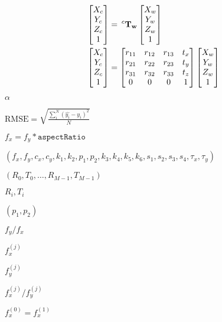 \documentclass{article}
\begin{document}
\[ \begin{align*} \begin{bmatrix} X_c \\ Y_c \\ Z_c \\ 1 \end{bmatrix} &= \hspace{0.2em} ^{c}\bf{T}_w \begin{bmatrix} X_{w} \\ Y_{w} \\ Z_{w} \\ 1 \end{bmatrix} \\ \begin{bmatrix} X_c \\ Y_c \\ Z_c \\ 1 \end{bmatrix} &= \begin{bmatrix} r_{11} & r_{12} & r_{13} & t_x \\ r_{21} & r_{22} & r_{23} & t_y \\ r_{31} & r_{32} & r_{33} & t_z \\ 0 & 0 & 0 & 1 \end{bmatrix} \begin{bmatrix} X_{w} \\ Y_{w} \\ Z_{w} \\ 1 \end{bmatrix} \end{align*} \]
\pagebreak

$\alpha$
\pagebreak

$ \text{RMSE} = \sqrt{\frac{\sum_{i}^{N} \left ( \hat{y_i} - y_i \right )^2}{N}} $
\pagebreak

$f_x = f_y * \texttt{aspectRatio}$
\pagebreak

$(f_x, f_y, c_x, c_y, k_1, k_2, p_1, p_2, k_3, k_4, k_5, k_6 , s_1, s_2, s_3, s_4, \tau_x, \tau_y)$
\pagebreak

$(R_0, T_0, \dotsc , R_{M - 1}, T_{M - 1})$
\pagebreak

$R_i, T_i$
\pagebreak

$(p_1, p_2)$
\pagebreak

$f_y/f_x$
\pagebreak

$f^{(j)}_x$
\pagebreak

$f^{(j)}_y$
\pagebreak

$f^{(j)}_x/f^{(j)}_y$
\pagebreak

$f^{(0)}_x=f^{(1)}_x$
\pagebreak
\end{document}
